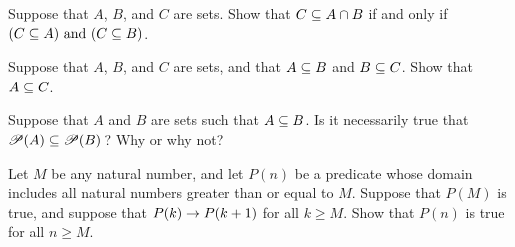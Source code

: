\begin{exercises}
\problem Suppose that $A$, $B$, and $C$ are sets.  Show that
$C\subseteq A\cap B$ if and only if $(C\subseteq A)\text{ and } (C\subseteq B)$.

\problem\label{E-subtrans} Suppose that $A$, $B$, and $C$ are sets, and that
$A\subseteq B$ and $B\subseteq C$.  Show that $A\subseteq C$.

\problem Suppose that $A$ and $B$ are sets such that $A\subseteq B$.
Is it necessarily true that ${\mathscr P}(A)\subseteq {\mathscr P}(B)\,$?
Why or why not?


\problem Let $M$ be any natural number, and let $P(n)$ be a
predicate whose domain includes all natural numbers
greater than or equal to $M$.  Suppose that $P(M)$ is true,
and suppose that $P(k)\rightarrow P(k+1)$ for all $k\ge M$.
Show that $P(n)$ is true for all $n\ge M$.


\end{exercises}






